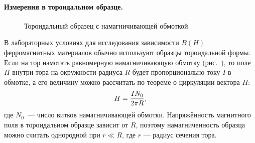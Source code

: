 %


\paragraph{Измерения в тороидальном образце.}

\begin{wrapfigure}[13]{r}{0.4\textwidth}
    \caption{Тороидальный образец с намагничивающей обмоткой}
\end{wrapfigure}

В лабораторных условиях для исследования зависимости $B(H)$ ферромагнитных
материалов обычно используют образцы тороидальной формы. Если на тор намотать
равномерную намагничивающую обмотку (рис.~), то поле $H$ внутри
тора на окружности радиуса $R$ будет пропорционально току $I$ в обмотке, а его
величину можно рассчитать по теореме о циркуляции вектора $H$:
\begin{equation}
    \eqmark{H-toroid}
    H = \frac{IN_0}{2\pi R},
\end{equation}
где $N_0$~--- число витков намагничивающей обмотки. Напряжённость магнитного
поля в тороидальном образце зависит от $R$, поэтому
намагниченность образца можно считать однородной при $r \ll R$, где $r$ ---
радиус сечения тора.

